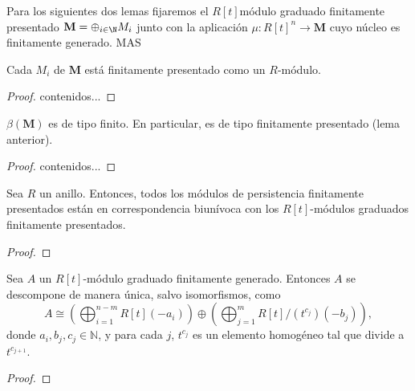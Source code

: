 Para los siguientes dos lemas fijaremos el $R[t]$módulo graduado finitamente presentado $\mathbf{M} = \oplus_{i \in \N} M_i$ junto con la aplicación $\mu : R[t]^n \to \mathbf{M}$ cuyo núcleo es finitamente generado. MAS

\begin{lema}
	Cada $M_i$ de $\mathbf{M}$ está finitamente presentado como un $R$-módulo.
\end{lema}
\begin{proof}
	contenidos...
\end{proof}

\begin{lema}
	$\beta(\mathbf{M})$ es de tipo finito. En particular, es de tipo finitamente presentado (lema anterior).
\end{lema}
\begin{proof}
	contenidos...
\end{proof}

\begin{teorema}
	Sea \( R \) un anillo. Entonces, todos los módulos de persistencia finitamente presentados están en correspondencia biunívoca con los \( R[t] \)-módulos graduados finitamente presentados.
\end{teorema}

\begin{proof}
\end{proof}

\begin{teorema}
	Sea \( A \) un \( R[t] \)-módulo graduado finitamente generado. Entonces \( A \) se descompone de manera única, salvo isomorfismos, como
	\[
	A \cong \left( \bigoplus_{i=1}^{n-m} R[t](-a_i) \right) \oplus \left( \bigoplus_{j=1}^{m} R[t]/(t^{c_j})(-b_j) \right),
	\]
	donde \( a_i, b_j, c_j \in \mathbb{N} \), y para cada \( j \), \( t^{c_j} \) es un elemento homogéneo tal que divide a \( t^{c_{j+1}} \).
\end{teorema}

\begin{proof}
\end{proof}

\endinput

